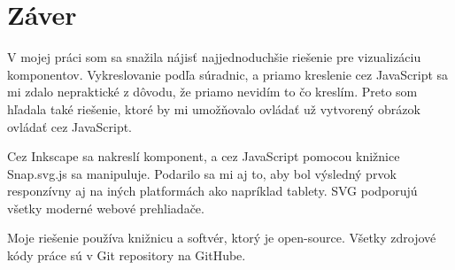 \chapter*{Záver}

V mojej práci som sa snažila nájisť najjednoduchšie riešenie pre vizualizáciu komponentov. Vykreslovanie podľa súradnic, a priamo kreslenie cez JavaScript sa mi zdalo nepraktické z dôvodu, že priamo nevidím to čo kreslím. Preto som hľadala také riešenie, ktoré by mi umožňovalo ovládať už vytvorený obrázok ovládať cez JavaScript. 

Cez Inkscape sa nakreslí komponent, a cez JavaScript pomocou knižnice Snap.svg.js sa manipuluje. Podarilo sa mi aj to, aby bol výsledný prvok responzívny aj na iných platformách ako napríklad tablety. SVG podporujú všetky moderné webové prehliadače.

Moje riešenie používa knižnicu a softvér, ktorý je open-source. Všetky zdrojové kódy práce sú v Git repository na GitHube.